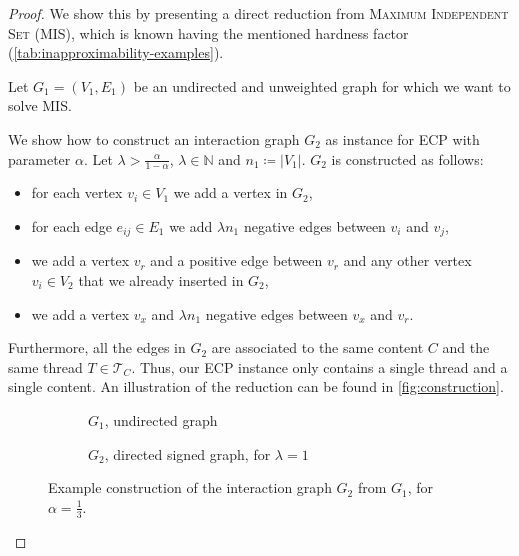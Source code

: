 \begin{proof}
	We show this by presenting a direct reduction from \textsc{Maximum
		Independent Set} (MIS), which is known having the mentioned hardness
	factor (\autoref{tab:inapproximability-examples}).

	\bigskip
	Let $G_{1}  = (V_{1} ,E_{1} )$ be an undirected and unweighted graph for
	which we want to solve MIS.

	We show how to construct an interaction graph \mbox{${G}_{2}$} as instance for \acrshort{ECP} with parameter
	$\alpha $. Let $\lambda > \frac{\alpha }{1 - \alpha }$, $\lambda \in \mathbb{N} $ and $n_{1} \coloneqq |V_{1}| $.
	$G_2$ is constructed as follows:

	\begin{itemize}
		\item for each vertex $v_{i}  \in V_{1} $ we add a vertex in $G_{2} $,
		\item for each edge $e_{ij}  \in
			      E_{1} $ we add $\lambda n_{1} $ negative edges between $v_{i}
		      $ and $v_{j} $,
		\item we add a vertex $v_r$ and a positive edge between $v_r$ and any other
		      vertex $v_i \in V_2$ that we already inserted in $G_2$,
		\item we add a vertex $v_x$ and $\lambda n_{1} $ negative edges between $v_x$
		      and $v_{r} $.
	\end{itemize}

	Furthermore, all the edges in $G_{2} $ are associated to the same content
	$C$ and the same thread $T \in \mathcal{T}_{C}  $.
	Thus, our \acrshort{ECP} instance only contains a single thread and a
	single content.  An illustration of the reduction can be found in \autoref{fig:construction}.

	\begin{figure}
		\begin{center}
			\begin{subfigure}{0.4\textwidth}
				\centering
				\vspace{10pt}
				\caption{$G_{1}$, undirected graph}
				\label{fig:g1_example}
			\end{subfigure}
			\begin{subfigure}{0.4\textwidth}
				\centering
				\caption{$G_{2}$, directed signed graph, for $\lambda = 1$}
				\label{fig:g2_example}
			\end{subfigure}
		\end{center}
		\caption[Example reduction from MIS to \acrshort{ECP}]{Example construction of the interaction graph $G_{2} $ from
			$G_{1} $, for $\alpha = \frac{1}{3} $.}
		\label{fig:construction}
	\end{figure}


\end{proof}
